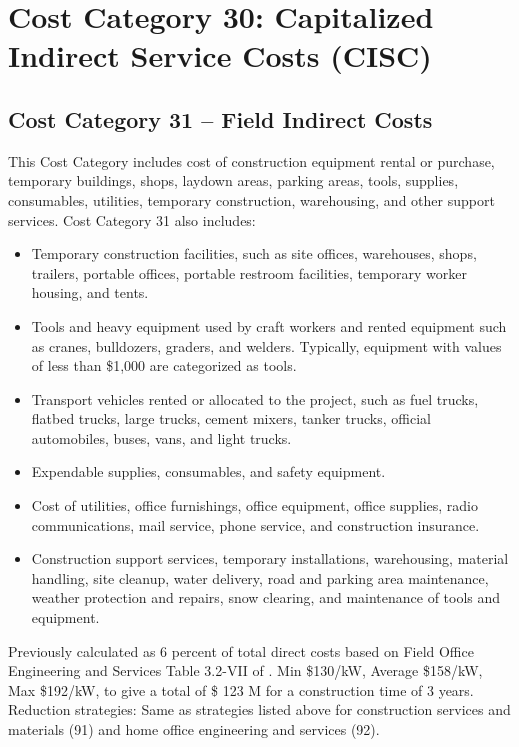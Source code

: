 \section{Cost Category 30: Capitalized Indirect Service Costs (CISC)}





\subsection*{Cost Category 31 – Field Indirect Costs}
This Cost Category includes cost of construction equipment rental or purchase, temporary buildings, shops, laydown areas, parking areas, tools, supplies, consumables, utilities, temporary construction, warehousing, and other support services. Cost Category 31 also includes:

\begin{itemize}
    \item Temporary construction facilities, such as site offices, warehouses, shops, trailers, portable offices, portable restroom facilities, temporary worker housing, and tents.
    \item Tools and heavy equipment used by craft workers and rented equipment such as cranes, bulldozers, graders, and welders. Typically, equipment with values of less than \$1,000 are categorized as tools.
    \item Transport vehicles rented or allocated to the project, such as fuel trucks, flatbed trucks, large trucks, cement mixers, tanker trucks, official automobiles, buses, vans, and light trucks.
    \item Expendable supplies, consumables, and safety equipment.
    \item Cost of utilities, office furnishings, office equipment, office supplies, radio communications, mail service, phone service, and construction insurance.
    \item Construction support services, temporary installations, warehousing, material handling, site cleanup, water delivery, road and parking area maintenance, weather protection and repairs, snow clearing, and maintenance of tools and equipment.
\end{itemize}

Previously calculated as 6 percent of total direct costs based on Field Office Engineering and 
Services Table 3.2-VII of \cite{SCH78}.  Min \$130/kW, Average \$158/kW, Max \$192/kW, to give a total of \$ 123 M for a construction time of 3 years. Reduction strategies: Same as strategies listed above for construction services and  materials (91) and home office engineering and services (92).\\

